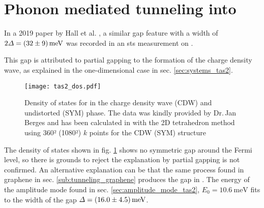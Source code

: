 \documentclass[main.tex]{subfiles}
\begin{document}
\section{Phonon mediated tunneling into \TaS}

In a 2019 paper by Hall et al. \cite{hall_environmental_2019}, a similar gap feature with a width of \(2 \Delta = \SI[separate-uncertainty = true]{32 \pm 9}{\milli\eV}\) was recorded in an \acrshort{sts} measurement on \TaS.

This gap is attributed to partial gapping to the formation of the charge density wave, as explained in the one-dimensional case in sec. \ref{sec:systems_tas2}.

\begin{figure}[htb!]
    \centering
    \texttt{[image: tas2\_dos.pdf]}
    \caption{Density of states for \TaS in the charge density wave (CDW) and undistorted (SYM) phase. The data was kindly provided by Dr.\,Jan Berges and has been calculated in \QE with the 2D tetrahedron method using 360² (1080²) \(k\) points for the CDW (SYM) structure}
    \label{fig:tas2_dos}
\end{figure}
The density of states shown in fig. \ref{fig:tas2_dos} shows no symmetric gap around the Fermi level, so there is grounds to reject the explanation by partial gapping is not confirmed.
An alternative explanation can be that the same process found in graphene in sec. \ref{sub:tunneling_graphene} produces the gap in \TaS.
The energy of the amplitude mode found in sec. \ref{sec:amplitude_mode_tas2}, \(E_0 = \SI{10.6}{\milli\eV}\) fits to the width of the gap \(\Delta = \SI[separate-uncertainty = true]{16 \pm 4.5}{\milli\eV}\).
\end{document}

